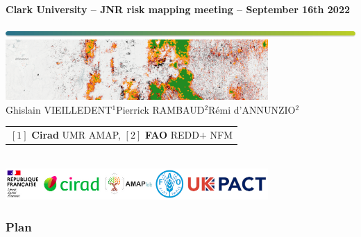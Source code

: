 {
  \begin{frame}
  
  \begin{center}
  \small{\textbf{Clark University -- JNR risk mapping meeting -- September 16th 2022}}
  \end{center}
  \vspace{-1cm}
  \titlepage %
  \vspace{-3.5cm}
  \begin{center}
    \includegraphics[width=\textwidth]{figs/Barre_couleur}\\
    \vspace{0.5cm}
    \includegraphics[width=10cm]{figs/riskmapjnr-example}\\
    \vspace{0.3cm}
    \small{Ghislain VIEILLEDENT$^{1}$\hspace{0.25cm}Pierrick RAMBAUD$^{2}$\hspace{0.25cm}Rémi d'ANNUNZIO$^{2}$}\\
    \vspace{0.15cm}
    {\scriptsize
      \begin{tabular}{l}
        $[1]$ \textbf{Cirad} UMR AMAP, $[2]$ \textbf{FAO} REDD$+$ NFM
      \end{tabular}
    }\\
    \vspace{0.3cm}
    \includegraphics[width=0.75\textwidth]{figs/partners_logos}
    
  \end{center}
  \end{frame}
}


\placelogotrue
\begin{frame}
  \frametitle{Plan}
  \begin{columns}[c]
    \begin{column}{0.5\textwidth}
      \tableofcontents[sections=1]
      \vspace{0.5cm}
      \tableofcontents[sections=2]
    \end{column}
    \begin{column}{0.5\textwidth}
        \tableofcontents[sections=3]
        \vspace{0.5cm}
        \tableofcontents[sections=4]
    \end{column}
  \end{columns}
\end{frame}
\placelogofalse